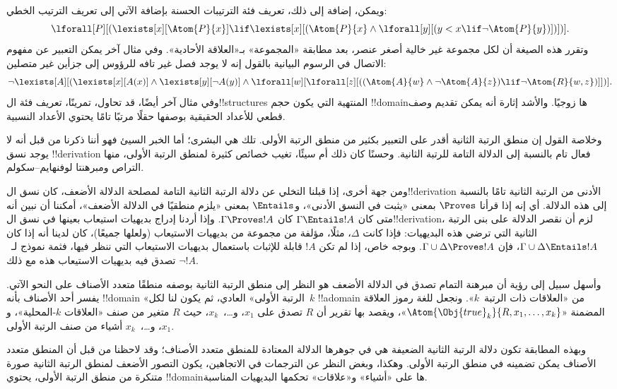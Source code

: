 \documentclass[../../../include/open-logic-section]{subfiles}
\begin{document}
ويمكن، إضافة إلى ذلك، تعريف فئة الترتيبات الحسنة بإضافة الآتي إلى
تعريف الترتيب الخطي:
\[
\lforall[P][(\lexists[x][\Atom{P}{x}] \lif \lexists[x][(\Atom{P}{x}
    \land \lforall[y][(y < x \lif \lnot \Atom{P}{y})])])].
\]
وتقرر هذه الصيغة أن لكل مجموعة غير خالية أصغر عنصر، بعد مطابقة
«المجموعة» بـ«العلاقة الأحادية». وفي مثال آخر يمكن التعبير عن مفهوم
الاتصال في الرسوم البيانية بالقول إنه لا يوجد فصل غير تافه للرؤوس إلى
جزأين غير متصلين:
\[
\lnot \lexists[A][(\lexists[x][A(x)] \land \lexists[y][\lnot A(y)]
  \land \lforall[w][\lforall[z][((\Atom{A}{w} \land \lnot \Atom{A}{z})
      \lif \lnot \Atom{R}{w,z})]])].
\]
وفي مثال آخر أيضًا، قد تحاول، تمرينًا، تعريف فئة ال!!{structure}s
المنتهية التي يكون حجم !!{domain}ها زوجيًا. والأشد إثارة أنه يمكن تقديم
وصف قطعي للأعداد الحقيقية بوصفها حقلًا مرتبًا تامًا يحتوي الأعداد
النسبية.

وخلاصة القول إن منطق الرتبة الثانية أقدر على التعبير بكثير من منطق
الرتبة الأولى. تلك هي البشرى؛ أما الخبر السيئ فهو أننا ذكرنا من قبل
أنه لا يوجد نسق !!{derivation} فعال تام بالنسبة إلى الدلالة التامة
للرتبة الثانية. وحسنًا كان ذلك أم سيئًا، تغيب خصائص كثيرة لمنطق الرتبة
الأولى، منها التراص ومبرهنتا لوفنهايم--سكولم.

ومن جهة أخرى، إذا قبلنا التخلي عن دلالة الرتبة الثانية التامة لمصلحة
الدلالة الأضعف، كان نسق ال!!{derivation} الأدنى من الرتبة الثانية تامًا
بالنسبة إلى هذه الدلالة. أي إنه إذا قرأنا $\Proves$ بمعنى «يثبت في
النسق الأدنى»، و$\Entails$ بمعنى «يلزم منطقيًا في الدلالة الأضعف»،
أمكننا أن نبين أنه متى كان $\Gamma \Entails !A$ كان $\Gamma \Proves
!A$. وإذا أردنا إدراج بديهيات استيعاب بعينها في نسق ال!!{derivation}،
لزم أن نقصر الدلالة على بنى الرتبة الثانية التي ترضي هذه البديهيات:
فإذا كانت $\Delta$، مثلًا، مؤلفة من مجموعة من بديهيات الاستيعاب
(ولعلها جميعًا)، كان لدينا أنه إذا كان $\Gamma \cup \Delta \Entails
!A$، فإن $\Gamma \cup \Delta \Proves !A$. وبوجه خاص، إذا لم تكن
$!A$ قابلة للإثبات باستعمال بديهيات الاستيعاب التي ننظر فيها، فثمة
نموذج لـ~$\lnot !A$ تصدق فيه بديهيات الاستيعاب هذه مع ذلك.

وأسهل سبيل إلى رؤية أن مبرهنة التمام تصدق في الدلالة الأضعف هو النظر
إلى منطق الرتبة الثانية بوصفه منطقًا متعدد الأصناف على النحو الآتي.
يفسر أحد الأصناف بأنه !!{domain} «الرتبة الأولى» العادي، ثم يكون لنا
لكل~$k$ !!a{domain} من «العلاقات ذات الرتبة~$k$». ونجعل للغة رموز
العلاقة المضمنة «$\Atom{\Obj{true}_k}{R,x_1,\dots,x_k}$»، ويقصد بها
تقرير أن $R$ تصدق على $x_1$، و\dots،~$x_k$، حيث $R$ متغير من صنف
«العلاقات $k$-المحلية»، و$x_1$، و\dots،~$x_k$ أشياء من صنف الرتبة
الأولى.

وبهذه المطابقة تكون دلالة الرتبة الثانية الضعيفة هي في جوهرها الدلالة
المعتادة للمنطق متعدد الأصناف؛ وقد لاحظنا من قبل أن المنطق متعدد
الأصناف يمكن تضمينه في منطق الرتبة الأولى. وهكذا، وبغض النظر عن
الترجمات في الاتجاهين، يكون التصور الأضعف لمنطق الرتبة الثانية صورة
متنكرة من منطق الرتبة الأولى، يحتوي !!{domain}ها على «أشياء» و«علاقات»
تحكمها البديهيات المناسبة.
\end{document}
